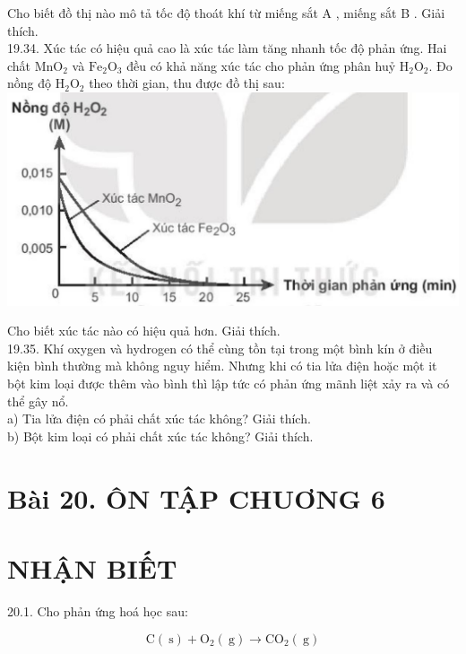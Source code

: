 \documentclass[10pt]{article}
\begin{document}
Cho biết đồ thị nào mô tả tốc độ thoát khí từ miếng sắt A , miếng sắt B . Giải thích.\\
19.34. Xúc tác có hiệu quả cao là xúc tác làm tăng nhanh tốc độ phản ứng. Hai chất $\mathrm{MnO}_{2}$ và $\mathrm{Fe}_{2} \mathrm{O}_{3}$ đều có khả năng xúc tác cho phản ứng phân huỷ $\mathrm{H}_{2} \mathrm{O}_{2}$. Đo nồng độ $\mathrm{H}_{2} \mathrm{O}_{2}$ theo thời gian, thu được đồ thị sau:\\
\includegraphics[max width=\textwidth, center]{2025_10_23_daab5c8457c85b365b9eg-58(1)}

Cho biết xúc tác nào có hiệu quả hơn. Giải thích.\\
19.35. Khí oxygen và hydrogen có thể cùng tồn tại trong một bình kín ở điều kiện bình thường mà không nguy hiểm. Nhưng khi có tia lửa điện hoặc một it bột kim loại được thêm vào bình thì lập tức có phản ứng mãnh liệt xảy ra và có thể gây nổ.\\
a) Tia lửa điện có phải chất xúc tác không? Giải thích.\\
b) Bột kim loại có phải chất xúc tác không? Giải thích.

\section*{Bài 20. ÔN TẬP CHUƠNG 6}
\section*{NHẬN BIẾT}
20.1. Cho phản ứng hoá học sau:

$$
\mathrm{C}(\mathrm{~s})+\mathrm{O}_{2}(\mathrm{~g}) \rightarrow \mathrm{CO}_{2}(\mathrm{~g})
$$
\end{document}
